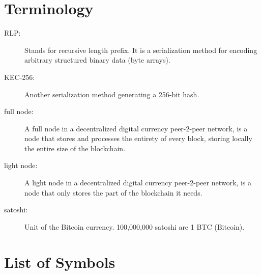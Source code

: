 \documentclass[USenglish]{uit-thesis}
\begin{document}



\begin{appendices}
	\chapter{Terminology}
	\label{app:terminology}
	\begin{description}
		\item[RLP:] Stands for recursive length prefix. It is a serialization method
		for encoding arbitrary structured binary data (byte arrays).
		\label{item:rlp}
		\item[KEC-256:] Another serialization method generating a 256-bit hash.
		\item[full node:] A full node in a decentralized digital currency peer-2-peer network, is a node that stores
		and processes the entirety of every block, storing locally the entire size of the blockchain.
		\item[light node:] A light node in a decentralized digital currency peer-2-peer network, is a node that only
		stores the part of the blockchain it needs.
		\item[satoshi:] Unit of the Bitcoin currency. 100,000,000 satoshi are 1 BTC (Bitcoin).
	\end{description}

\chapter{List of Symbols}


\end{appendices}
\end{document}
